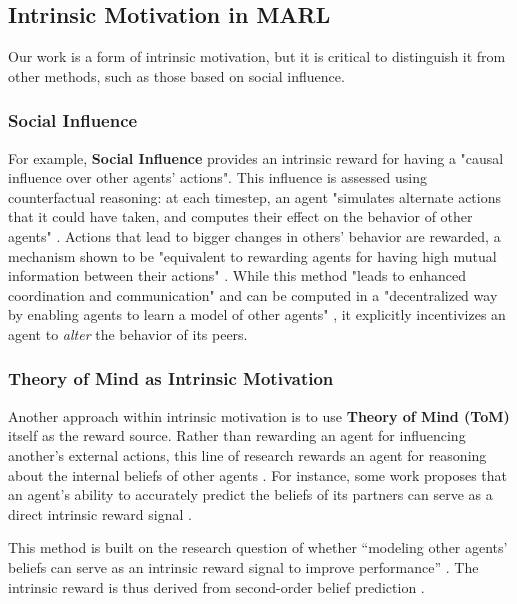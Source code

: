\documentclass[12pt, a4paper]{report}
\begin{document}
\subsection{Intrinsic Motivation in MARL}
Our work is a form of intrinsic motivation, but it is critical to distinguish it from other methods, such as those based on social influence.

\subsubsection{Social Influence}
For example, \textbf{Social Influence} \cite{Jaques2019} provides an intrinsic reward for having a "causal influence over other agents' actions". This influence is assessed using counterfactual reasoning: at each timestep, an agent "simulates alternate actions that it could have taken, and computes their effect on the behavior of other agents" \cite{Jaques2019}. Actions that lead to bigger changes in others' behavior are rewarded, a mechanism shown to be "equivalent to rewarding agents for having high mutual information between their actions" \cite{Jaques2019}. While this method "leads to enhanced coordination and communication" and can be computed in a "decentralized way by enabling agents to learn a model of other agents" \cite{Jaques2019}, it explicitly incentivizes an agent to \textit{alter} the behavior of its peers.

\subsubsection{Theory of Mind as Intrinsic Motivation}
Another approach within intrinsic motivation is to use \textbf{Theory of Mind (ToM)} itself as the reward source. 
Rather than rewarding an agent for influencing another's external actions, this line of research rewards an agent for reasoning about the internal beliefs of other agents \cite{oguntola2023theory}. 
For instance, some work proposes that an agent's ability to accurately predict the beliefs of its partners can serve as a direct intrinsic reward signal \cite{oguntola2023theory}.

This method is built on the research question of whether ``modeling other agents' beliefs can serve as an intrinsic reward signal to improve performance'' \cite{oguntola2023theory}. 
The intrinsic reward is thus derived from second-order belief prediction \cite{oguntola2023theory}.
\end{document}
